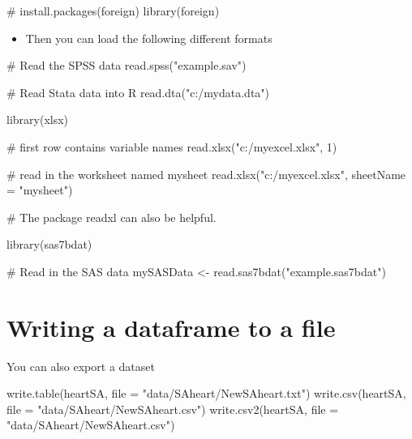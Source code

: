 \documentclass[
  letterpaper,
  DIV=11,
  numbers=noendperiod]{scrreprt}
\newenvironment{Shaded}{\begin{snugshade}}{\end{snugshade}}
\newcommand{\AttributeTok}[1]{\textcolor[rgb]{0.40,0.45,0.13}{#1}}
\newcommand{\CommentTok}[1]{\textcolor[rgb]{0.37,0.37,0.37}{#1}}
\newcommand{\DecValTok}[1]{\textcolor[rgb]{0.68,0.00,0.00}{#1}}
\newcommand{\FunctionTok}[1]{\textcolor[rgb]{0.28,0.35,0.67}{#1}}
\newcommand{\NormalTok}[1]{\textcolor[rgb]{0.00,0.23,0.31}{#1}}
\newcommand{\OtherTok}[1]{\textcolor[rgb]{0.00,0.23,0.31}{#1}}
\newcommand{\StringTok}[1]{\textcolor[rgb]{0.13,0.47,0.30}{#1}}
\providecommand{\tightlist}{%
  \setlength{\itemsep}{0pt}\setlength{\parskip}{0pt}}\usepackage{longtable,booktabs,array}
\begin{document}
\begin{Shaded}
\begin{Highlighting}[]
\CommentTok{\# install.packages(\textquotesingle{}foreign\textquotesingle{})}
\FunctionTok{library}\NormalTok{(foreign)}
\end{Highlighting}
\end{Shaded}

\begin{itemize}
\tightlist
\item
  Then you can load the following different formats
\end{itemize}

\begin{Shaded}
\begin{Highlighting}[]
\CommentTok{\# Read the SPSS data}
\FunctionTok{read.spss}\NormalTok{(}\StringTok{"example.sav"}\NormalTok{)}

\CommentTok{\# Read Stata data into R}
\FunctionTok{read.dta}\NormalTok{(}\StringTok{"c:/mydata.dta"}\NormalTok{) }

\FunctionTok{library}\NormalTok{(xlsx)}

\CommentTok{\# first row contains variable names}
\FunctionTok{read.xlsx}\NormalTok{(}\StringTok{"c:/myexcel.xlsx"}\NormalTok{, }\DecValTok{1}\NormalTok{)}

\CommentTok{\# read in the worksheet named mysheet}
\FunctionTok{read.xlsx}\NormalTok{(}\StringTok{"c:/myexcel.xlsx"}\NormalTok{, }\AttributeTok{sheetName =} \StringTok{"mysheet"}\NormalTok{) }

\CommentTok{\# The package \textasciigrave{}readxl\textasciigrave{} can also be helpful.}

\FunctionTok{library}\NormalTok{(sas7bdat)}

\CommentTok{\# Read in the SAS data}
\NormalTok{mySASData }\OtherTok{\textless{}{-}} \FunctionTok{read.sas7bdat}\NormalTok{(}\StringTok{"example.sas7bdat"}\NormalTok{)}
\end{Highlighting}
\end{Shaded}

\section{Writing a dataframe to a
file}\label{writing-a-dataframe-to-a-file}

You can also export a dataset

\begin{Shaded}
\begin{Highlighting}[]
\FunctionTok{write.table}\NormalTok{(heartSA, }\AttributeTok{file =} \StringTok{"data/SAheart/NewSAheart.txt"}\NormalTok{)}
\FunctionTok{write.csv}\NormalTok{(heartSA, }\AttributeTok{file =} \StringTok{"data/SAheart/NewSAheart.csv"}\NormalTok{)}
\FunctionTok{write.csv2}\NormalTok{(heartSA, }\AttributeTok{file =} \StringTok{"data/SAheart/NewSAheart.csv"}\NormalTok{)}
\end{Highlighting}
\end{Shaded}
\end{document}
